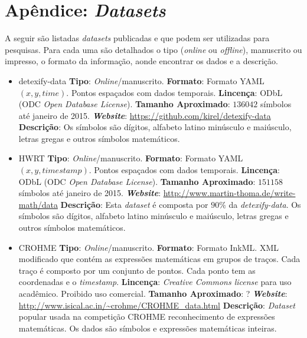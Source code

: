 \appendix
\iffalse
\chapter{Apêndice: \textit{Datasets}}


A seguir são listadas \textit{datasets} publicadas e que podem ser utilizadas para pesquisas. Para cada uma são detalhados o tipo (\textit{online} ou \textit{offline}), manuscrito ou impresso, o formato da informação, aonde encontrar os dados e a descrição.

\begin{itemize}
	\item detexify-data \cite{kirsch2010detexify}
	\subitem \textbf{Tipo}: \textit{Online}/manuscrito.
	\subitem \textbf{Formato}: Formato YAML $(x, y, time)$. Pontos espaçados com dados temporais.
	\subitem \textbf{Lincença}: ODbL (ODC \textit{Open Database License}).
	\subitem \textbf{Tamanho Aproximado}: $136042$ símbolos até janeiro de 2015.
	\subitem \textit{\textbf{Website}}: \url{https://github.com/kirel/detexify-data}
	\subitem \textbf{Descrição}: Os símbolos são dígitos, alfabeto latino minúsculo e maiúsculo, letras gregas e outros símbolos matemáticos.
	
	\item HWRT \cite{thoma2015line}
	\subitem \textbf{Tipo}: \textit{Online}/manuscrito.
	\subitem \textbf{Formato}: Formato YAML $(x, y, timestamp)$. Pontos espaçados com dados temporais.
	\subitem \textbf{Lincença}: ODbL (ODC \textit{Open Database License}).
	\subitem \textbf{Tamanho Aproximado}: $151158$ símbolos até janeiro de 2015.
	\subitem \textit{\textbf{Website}}: \url{http://www.martin-thoma.de/write-math/data}
	\subitem \textbf{Descrição}: Esta \textit{dataset} é composta por $90\%$ da \textit{detexify-data}. Os símbolos são dígitos, alfabeto latino minúsculo e maiúsculo, letras gregas e outros símbolos matemáticos.
	
	\item CROHME
	\subitem \textbf{Tipo}: \textit{Online}/manuscrito.
	\subitem \textbf{Formato}: Formato InkML. XML modificado que contém as expressões matemáticas em grupos de traços. Cada traço é composto por um conjunto de pontos. Cada ponto tem as coordenadas e o \textit{timestamp}.
	\subitem \textbf{Lincença}: \textit{Creative Commons license} para uso acadêmico. Proibido uso comercial.
	\subitem \textbf{Tamanho Aproximado}: ?
	\subitem \textit{\textbf{Website}}: \url{http://www.isical.ac.in/~crohme/CROHME_data.html}
	\subitem \textbf{Descrição}: \textit{Dataset} popular usada na competição CROHME reconhecimento de expressões matemáticas. Os dados são símbolos e expressões matemáticas inteiras.
	

\end{itemize}
